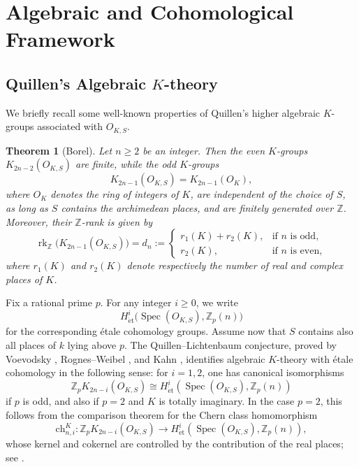 \documentclass[a4paper,11pt]{article}
\newtheorem{theorem}{Theorem}[section]
\begin{document}
\section{Algebraic and Cohomological Framework}\label{preliminaries}
\subsection{Quillen's Algebraic \texorpdfstring{$K$}{K}-theory}
We briefly recall some well-known properties of Quillen's higher algebraic
\(K\)-groups associated with \(O_{K,S}\).

\begin{theorem}[Borel]
Let \(n \geq 2\) be an integer. Then the even \(K\)-groups
\(K_{2n-2}(O_{K,S})\) are finite, while the odd \(K\)-groups
\[
K_{2n-1}(O_{K,S}) = K_{2n-1}(O_K),
\]
where \(O_K\) denotes the ring of integers of \(K\), are independent of the
choice of \(S\), as long as \(S\) contains the archimedean places, and are
finitely generated over \(\mathbb Z\). Moreover, their \(\mathbb Z\)-rank is
given by
\[
\operatorname{rk}_{\mathbb Z}\bigl(K_{2n-1}(O_{K,S})\bigr)=d_n:=
\begin{cases}
r_1(K)+r_2(K), & \text{if \(n\) is odd},\\
r_2(K), & \text{if \(n\) is even},
\end{cases}
\]
where \(r_1(K)\) and \(r_2(K)\) denote respectively the number of real and
complex places of \(K\).
\end{theorem}

\medskip

\noindent Fix a rational prime \(p\). For any integer \(i \geq 0\), we write
\[
H^i_{\mathrm{\acute{e}t}}\bigl(\operatorname{Spec}(O_{K,S}),\mathbb Z_p(n)\bigr)
\]
for the corresponding étale cohomology groups. Assume now that \(S\)
contains also all places of \(k\) lying above \(p\). The Quillen--Lichtenbaum
conjecture, proved by Voevodsky \cite{Voevodsky}, Rognes--Weibel
\cite{RognesWeibel}, and Kahn \cite{Kahn}, identifies algebraic \(K\)-theory
with étale cohomology in the following sense: for \(i=1,2\), one has canonical
isomorphisms
\[
\mathbb Z_pK_{2n-i}(O_{K,S})
\cong
H^i_{\mathrm{\acute{e}t}}(\operatorname{Spec}(O_{K,S}),\mathbb Z_p(n))
\]
if \(p\) is odd, and also if \(p=2\) and \(K\) is totally imaginary. In the case
\(p=2\), this follows from the comparison theorem for the Chern class
homomorphism
\[
\mathrm{ch}^K_{n,i}:
\mathbb Z_pK_{2n-i}(O_{K,S})
\longrightarrow
H^i_{\mathrm{\acute{e}t}}(\operatorname{Spec}(O_{K,S}),\mathbb Z_p(n)),
\]
whose kernel and cokernel are controlled by the contribution of the real
places; see \cite{RognesWeibel,Kahn}.
\end{document}
